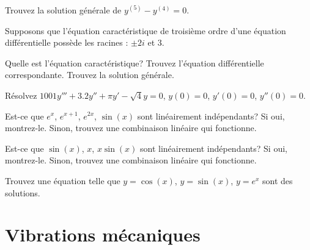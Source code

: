 \setcounter{exercise}{100}

\begin{exercise}
Trouvez la solution générale de $y^{(5)}-y^{(4)}=0$.
\end{exercise}

\begin{exercise}
\pagebreak[2]
Supposons que l'équation caractéristique de troisième ordre d'une équation différentielle possède les racines : $\pm 2i$ et 3.
\begin{tasks}
\task
Quelle est l'équation caractéristique?
\task
Trouvez l'équation différentielle correspondante. 
\task
Trouvez la solution générale.
\end{tasks}
\end{exercise}

\begin{exercise}
Résolvez $1001y'''+3.2y''+\pi y'-\sqrt{4} y = 0$, $y(0)=0$, $y'(0) = 0$,
$y''(0) = 0$.
\end{exercise}

\begin{exercise}
Est-ce que  $e^{x}$, $e^{x+1}$, $e^{2x}$, $\sin(x)$ sont linéairement indépendants?  Si oui, montrez-le. Sinon, trouvez une combinaison linéaire qui fonctionne. 
\end{exercise}

\begin{exercise}
Est-ce que   $\sin(x)$, $x$, $x\sin(x)$ sont linéairement indépendants?  Si oui, montrez-le. Sinon, trouvez une combinaison linéaire qui fonctionne. 
\end{exercise}

\begin{exercise}
Trouvez une équation telle que $y=\cos(x)$, $y=\sin(x)$, $y=e^x$ sont des solutions.
\end{exercise}



\sectionnewpage
\section{Vibrations mécaniques} \label{sec:mv}

